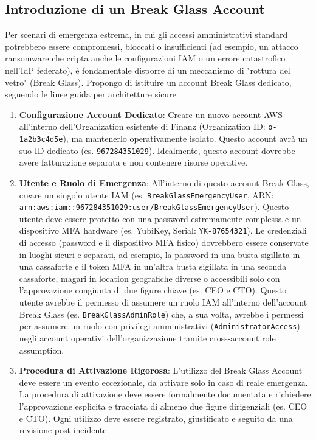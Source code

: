 \subsection{Introduzione di un Break Glass Account}
\label{subsubsec:break_glass_account_iam}
Per scenari di emergenza estrema, in cui gli accessi amministrativi standard potrebbero essere compromessi, bloccati o insufficienti (ad esempio, un attacco ransomware che cripta anche le configurazioni IAM o un errore catastrofico nell'IdP federato), è fondamentale disporre di un meccanismo di "rottura del vetro" (Break Glass). Propongo di istituire un account Break Glass dedicato, seguendo le linee guida per architetture sicure \cite{saraswat:breakglass}.
\begin{enumerate}
    \item \textbf{Configurazione Account Dedicato}: Creare un nuovo account AWS all'interno dell'Organization esistente di Finanz (Organization ID: \texttt{o-1a2b3c4d5e}), ma mantenerlo operativamente isolato. Questo account avrà un suo ID dedicato (es. \texttt{967284351029}). Idealmente, questo account dovrebbe avere fatturazione separata e non contenere risorse operative.
    \item \textbf{Utente e Ruolo di Emergenza}: All'interno di questo account Break Glass, creare un singolo utente IAM (es. \texttt{BreakGlassEmergencyUser}, ARN: \texttt{arn:aws:iam::967284351029:user/BreakGlassEmergencyUser}). Questo utente deve essere protetto con una password estremamente complessa e un dispositivo MFA hardware (es. YubiKey, Serial: \texttt{YK-87654321}). Le credenziali di accesso (password e il dispositivo MFA fisico) dovrebbero essere conservate in luoghi sicuri e separati, ad esempio, la password in una busta sigillata in una cassaforte e il token MFA in un'altra busta sigillata in una seconda cassaforte, magari in location geografiche diverse o accessibili solo con l'approvazione congiunta di due figure chiave (es. CEO e CTO). Questo utente avrebbe il permesso di assumere un ruolo IAM all'interno dell'account Break Glass (es. \texttt{BreakGlassAdminRole}) che, a sua volta, avrebbe i permessi per assumere un ruolo con privilegi amministrativi (\texttt{AdministratorAccess}) negli account operativi dell'organizzazione tramite cross-account role assumption.
    \item \textbf{Procedura di Attivazione Rigorosa}: L'utilizzo del Break Glass Account deve essere un evento eccezionale, da attivare solo in caso di reale emergenza. La procedura di attivazione deve essere formalmente documentata e richiedere l'approvazione esplicita e tracciata di almeno due figure dirigenziali (es. CEO e CTO). Ogni utilizzo deve essere registrato, giustificato e seguito da una revisione post-incidente.

\end{enumerate}
